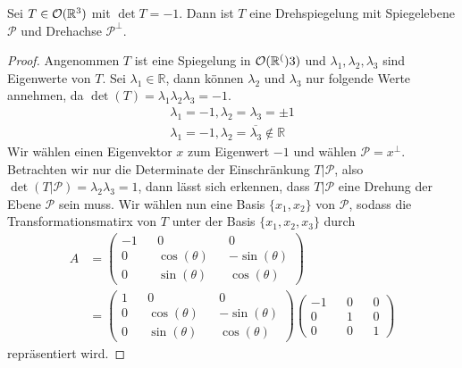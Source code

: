 \newpage
\begin{theorem}
 Sei $T\in{\mathcal{O}(\mathbb{R}^3)}$ mit $\det T = -1$. Dann ist $T$ eine Drehspiegelung mit Spiegelebene $\mathcal{P}$ und Drehachse $\mathcal{P}^{\perp}$.
\end{theorem}
\begin{proof}
 Angenommen $T$ ist eine Spiegelung in ${\mathcal{O}(\mathbb{R}^()}3)$ und $\lambda_1,\lambda_2,\lambda_3$ sind Eigenwerte von $T$. Sei $\lambda_1 \in \mathbb{R}$, dann können $\lambda_2$ und $\lambda_3$ nur folgende Werte annehmen, da $\det(T)=\lambda_1\lambda_2\lambda_3=-1$.
 \setcounter{equation}{0}
 \begin{align}
  \lambda_1=-1, \lambda_2=\lambda_3=\pm1 \\
  \lambda_1=-1, \lambda_2=\overline{\lambda_3}\notin \mathbb{R}
 \end{align}
 Wir wählen einen Eigenvektor $x$ zum Eigenwert $-1$ und wählen $\mathcal{P}=x^{\perp}$. Betrachten wir nur die Determinate der Einschränkung $T|\mathcal{P}$, also $\det(T|\mathcal{P})=\lambda_2\lambda_3=1$, dann lässt sich erkennen, dass $T|\mathcal{P}$ eine Drehung der Ebene $\mathcal{P}$ sein muss. Wir wählen nun eine Basis $\{x_1,x_2\}$ von $\mathcal{P}$, sodass die Transformationsmatirx von $T$ unter der Basis $\{x_1,x_2,x_3\}$ durch \begin{align*}
  A&=
\begin{pmatrix}
        -1 && 0 && 0 \\
        0 && \cos(\theta) && -\sin(\theta) \\
        0 && \sin(\theta) && \cos(\theta)
       \end{pmatrix} \\ &=
       \begin{pmatrix}
        1 && 0 && 0 \\
        0 && \cos(\theta) && -\sin(\theta) \\
        0 && \sin(\theta) && \cos(\theta)
       \end{pmatrix} 
       \begin{pmatrix}
        -1 && 0 && 0 \\
        0 && 1 && 0 \\
        0 && 0 && 1
       \end{pmatrix}
 \end{align*}
repräsentiert wird.
\end{proof}




